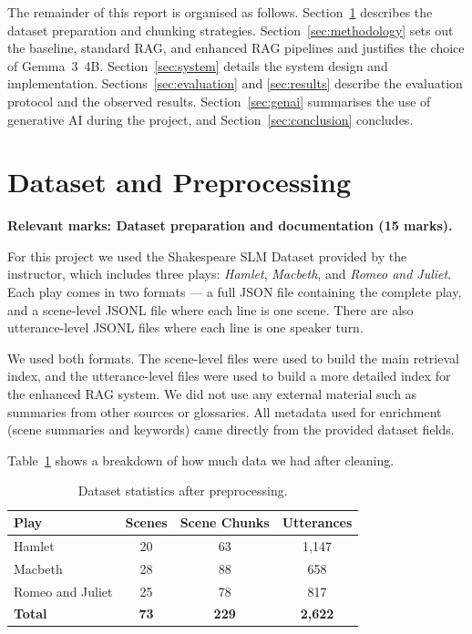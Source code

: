 \documentclass[10pt,conference]{IEEEtran}
\begin{document}
The remainder of this report is organised as follows.
Section~\ref{sec:dataset} describes the dataset preparation and
chunking strategies. Section~\ref{sec:methodology} sets out the
baseline, standard RAG, and enhanced RAG pipelines and justifies the
choice of Gemma~3~4B. Section~\ref{sec:system} details the system
design and implementation. Sections~\ref{sec:evaluation} and
\ref{sec:results} describe the evaluation protocol and the observed
results. Section~\ref{sec:genai} summarises the use of generative AI
during the project, and Section~\ref{sec:conclusion} concludes.

\section{Dataset and Preprocessing}
\label{sec:dataset}

\textbf{Relevant marks: Dataset preparation and documentation
(15 marks).}

For this project we used the Shakespeare SLM Dataset provided by the
instructor, which includes three plays: \textit{Hamlet},
\textit{Macbeth}, and \textit{Romeo and Juliet}. Each play comes in
two formats --- a full JSON file containing the complete play, and a
scene-level JSONL file where each line is one scene. There are also
utterance-level JSONL files where each line is one speaker turn.

We used both formats. The scene-level files were used to build the
main retrieval index, and the utterance-level files were used to
build a more detailed index for the enhanced RAG system. We did not
use any external material such as summaries from other sources or
glossaries. All metadata used for enrichment (scene summaries and
keywords) came directly from the provided dataset fields.

Table~\ref{tab:dataset-stats} shows a breakdown of how much data we
had after cleaning.

\begin{table}[ht]
\centering
\caption{Dataset statistics after preprocessing.}
\label{tab:dataset-stats}
\begin{tabular}{lccc}
\toprule
Play & Scenes & Scene Chunks & Utterances \\
\midrule
Hamlet           & 20 & 63  & 1{,}147 \\
Macbeth          & 28 & 88  & 658   \\
Romeo and Juliet & 25 & 78  & 817   \\
\midrule
\textbf{Total} & \textbf{73} & \textbf{229} & \textbf{2{,}622} \\
\bottomrule
\end{tabular}
\end{table}
\end{document}
